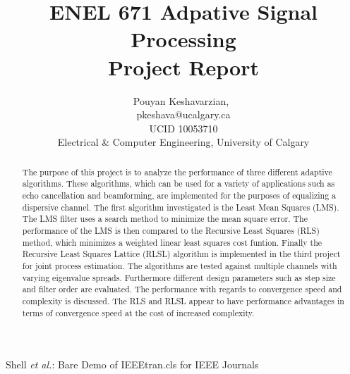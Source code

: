 \documentclass[journal]{IEEEtran}
\begin{document}
%
\title{ENEL 671 Adpative Signal Processing\\ Project Report}
%
%
%

\author{Pouyan Keshavarzian,~
\\ pkeshava@ucalgary.ca
\\ UCID 10053710
\\Electrical \& Computer Engineering, University of Calgary}

%
{Shell \MakeLowercase{\textit{et al.}}: Bare Demo of IEEEtran.cls for IEEE Journals}
%


\maketitle
\begin{abstract}
The purpose of this project is to analyze the performance of three different
adaptive algorithms. These algorithms, which can be used for a variety of
applications such as echo cancellation and beamforming, are implemented for
the purposes of equalizing a dispersive channel. The first algorithm
investigated is the Least Mean Squares (LMS). The LMS filter uses a search method to minimize the mean square error.
The performance of the LMS is then compared to the Recursive Least Squares (RLS) method, which minimizes a weighted linear least squares cost funtion.
Finally the Recursive Least Squares Lattice (RLSL) algorithm is implemented in the third project for joint process estimation.
The algorithms are tested against multiple channels with varying eigenvalue spreads. Furthermore
different design parameters such as step size and filter order are evaluated.
The performance with regards to convergence speed and complexity is discussed. The RLS and RLSL appear to have
performance advantages in terms of convergence speed at the cost of increased complexity.
\end{abstract}
\end{document}
